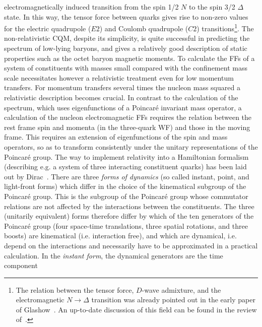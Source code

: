 electromagnetically induced transition 
from the spin 1/2 $N$ to the spin 3/2 $\Delta$ state. 
In this way, the tensor force between quarks gives rise to non-zero values 
for the electric quadrupole ($E2$) and Coulomb quadrupole ($C2$) 
transitions\footnote{  
The relation between the tensor force, $D$-wave admixture,
and the electromagnetic $N \to \Delta$ transition 
was already pointed out in the early paper of 
Glashow~\cite{Glashow79}. An up-to-date discussion of this field 
can be found in the review of~\cite{PVY06}.}. 
\newline
\indent
The non-relativistic CQM, despite its simplicity, 
is quite successful in predicting the spectrum of 
low-lying baryons, and gives a relatively good 
description of static properties such as the octet baryon magnetic moments.  
To calculate the FFs of a system of constituents with  
masses small compared with the confinement mass scale necessitates however 
a relativistic treatment even for low momentum transfers. For momentum 
transfers several times the nucleon mass squared a relativistic description  
becomes crucial. 
\newline
\indent
In contrast to the calculation of the spectrum, which uses eigenfunctions 
of a Poincar\'e invariant mass operator, 
a calculation of the nucleon electromagnetic FFs requires 
the relation between the rest frame spin and momenta 
(in the three-quark WF) and those in the moving frame.  
This requires 
an extension of eigenfunctions of the spin and mass operators, 
so as to transform consistently under 
the unitary representations of the Poincar\'e group.  
The way to implement relativity into a Hamiltonian formalism 
(describing e.g. a system of three interacting constituent quarks) 
has been laid 
out by Dirac~\cite{dirac}. There are three {\it forms of dynamics} 
(so called instant, point, and light-front forms) which 
differ in the choice of the kinematical subgroup of the Poincar\'e group. 
This is the subgroup of the Poincar\'e group whose commutator relations 
are not affected by the interactions between the constituents. 
The three (unitarily equivalent) forms therefore 
differ by which of the ten generators of the Poincar\'e group 
(four space-time translations, three spatial rotations, and three boosts) 
are kinematical (i.e. interaction free),  
and which are dynamical, i.e. depend on the interactions and 
necessarily have to be approximated in a practical calculation. 
\newline
\indent
In the {\it instant form}, the dynamical generators are the time component 
